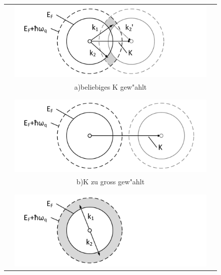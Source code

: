 \begin{refsection}
\begin{figure}
\centering
  \begin{tabular}{l c l}
  \centering
    &
    \begin{minipage}{0.6\textwidth}
	\includegraphics[width=1.1\textwidth]{supraleitung/Graphics/kGraphic05g.pdf}
    \end{minipage}
    \\
    &
    a)\quad beliebiges K gew"ahlt		%
    \\
    \\
    \\
    &
    \begin{minipage}{0.6\textwidth}
	\includegraphics[width=1.1\textwidth]{supraleitung/Graphics/kGraphic06g.pdf} 
    \end{minipage}
    \\
    &		
    b)\quad K zu gross gew"ahlt			%
    \\
    \\
    \\
    &
    \begin{minipage}{0.6\textwidth}
	\includegraphics[width=1.1\textwidth]{supraleitung/Graphics/kGraphic09g.pdf}

\end{minipage}
\end{tabular}
\end{figure}
\end{refsection}
